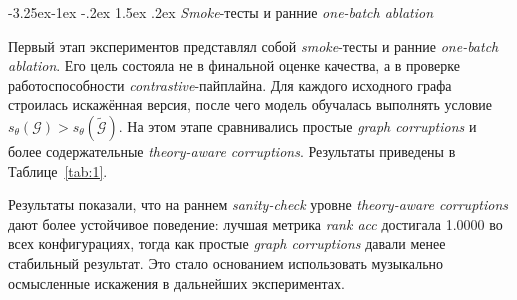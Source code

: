 \documentclass[a4paper,12pt]{extarticle}
\makeatletter
\renewcommand\subsubsection{\@startsection{subsubsection}{3}{\z@}%
  {-3.25ex\@plus -1ex \@minus -.2ex}%
  {1.5ex \@plus .2ex}%
  {\normalfont\normalsize\bfseries\Needspace{5\baselineskip}}}
\makeatother
\begin{document}
\subsubsection{\textit{Smoke}-тесты и ранние \textit{one-batch ablation}}

Первый этап экспериментов представлял собой \textit{smoke}-тесты и ранние \textit{one-batch ablation}. Его цель состояла не в финальной оценке качества, а в проверке работоспособности \textit{contrastive}-пайплайна. Для каждого исходного графа строилась искажённая версия, после чего модель обучалась выполнять условие $s_\theta(\mathcal{G})>s_\theta(\widetilde{\mathcal{G}})$. На этом этапе сравнивались простые \textit{graph corruptions} и более содержательные \textit{theory-aware corruptions}. Результаты приведены в Таблице~\ref{tab:1}.

\begin{table}[htbp]
\caption{\textit{Smoke}-тесты и ранние \textit{one-batch ablation}}
\label{tab:1}
\centering
\footnotesize
{}
\end{table}

Результаты показали, что на раннем \textit{sanity-check} уровне \textit{theory-aware corruptions} дают более устойчивое поведение: лучшая метрика \textit{rank acc} достигала 1.0000 во всех конфигурациях, тогда как простые \textit{graph corruptions} давали менее стабильный результат. Это стало основанием использовать музыкально осмысленные искажения в дальнейших экспериментах.
\end{document}
